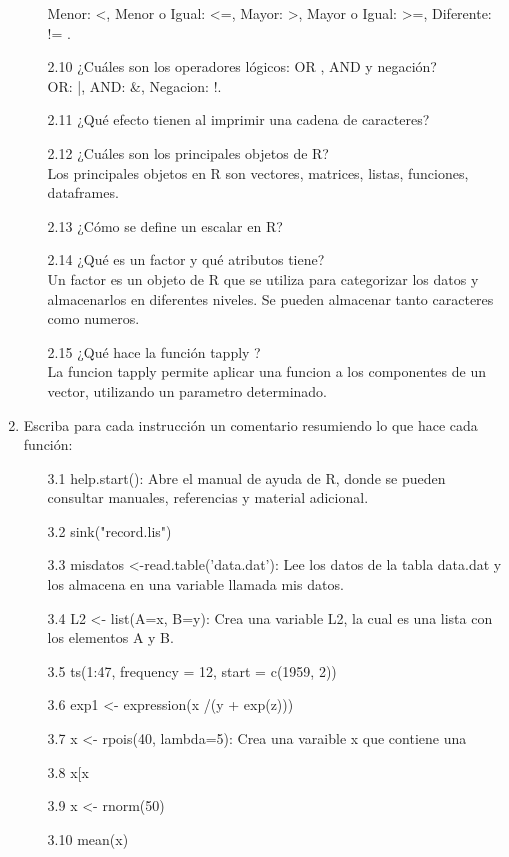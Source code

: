 \documentclass[letterpaper, 12pt]{article}
\begin{document}
\begin{enumerate}
\begin{enumerate}
Menor: <, Menor o Igual: <=, Mayor: >, Mayor o Igual: >=, Diferente: != . 
\item[2.10] ¿Cuáles son los operadores lógicos: OR , AND y negación?\\
OR: |, AND: \&, Negacion: !.
\item[2.11] ¿Qué efecto tienen  al imprimir una cadena de caracteres?
\item[2.12] ¿Cuáles son los principales objetos de R?\\
Los principales objetos en R son vectores, matrices, listas, funciones, dataframes.
\item[2.13] ¿Cómo se define un escalar en R?\\
\item[2.14] ¿Qué es un factor y qué atributos tiene?\\
Un factor es un objeto de R que se utiliza para categorizar los datos y almacenarlos en diferentes niveles. Se pueden almacenar tanto caracteres como numeros.
\item[2.15] ¿Qué hace la función tapply ?\\
La funcion tapply permite aplicar una funcion a los componentes de un vector, utilizando un parametro determinado. 
\end{enumerate}

\item Escriba para cada instrucción un comentario resumiendo lo que hace
cada función:
\begin{enumerate}
\item[3.1] help.start(): Abre el manual de ayuda de R, donde se pueden consultar manuales, referencias y material adicional.
\item[3.2] sink("record.lis")
\item[3.3] misdatos <-read.table('data.dat'): Lee los datos de la tabla data.dat y los almacena en una variable llamada mis datos.
\item[3.4] L2 <- list(A=x, B=y): Crea una variable L2, la cual es una lista con los elementos A y B.
\item[3.5] ts(1:47, frequency = 12, start = c(1959, 2))
\item[3.6] exp1 <- expression(x /(y + exp(z)))
\item[3.7] x <- rpois(40, lambda=5): Crea una varaible x que contiene una 
\item[3.8] x[x %
\item[3.9] x <- rnorm(50)
\item[3.10] mean(x)
\end{enumerate}


\end{enumerate}
\end{document}
